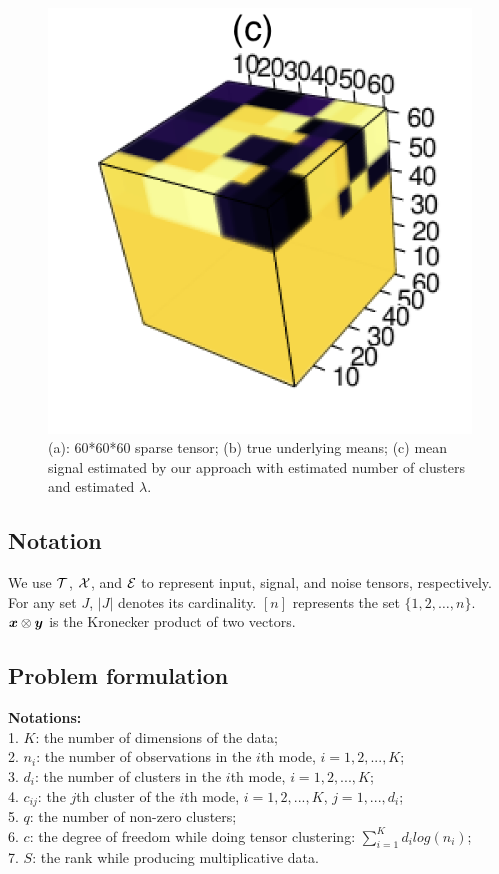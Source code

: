 \documentclass{article}
\begin{document}
\begin{figure}
	\includegraphics[scale=0.5]{figures/figure2/output.png}
	\caption{(a): 60*60*60 sparse tensor; (b) true underlying means; (c) mean signal estimated by our approach with estimated number of clusters and estimated $\lambda$.}
	\label{fig2}
\end{figure}
\subsection{Notation}
We use $\mathcal{T}$, $\mathcal{X}$, and $\mathcal{E}$ to represent input, signal, and noise tensors, respectively. For any set $J$, $|J|$ denotes its cardinality. $[n]$ represents the set $\{1,2,\ldots,n\}$. $\bm x\otimes \bm{y}$ is the Kronecker product of two vectors. 


\subsection{Problem formulation}
\textbf{Notations:}\\
1. $K$: the number of dimensions of the data;\\
2. $n_i$: the number of observations in the $i$th mode, $i=1,2,...,K$;\\
3. $d_i$: the number of clusters in the $i$th mode, $i=1,2,...,K$;\\
4. $c_{ij}$: the $j$th cluster of the $i$th mode, $i=1,2,...,K$, $j=1,...,d_i$;\\
5. $q$: the number of non-zero clusters;\\
6. $c$: the degree of freedom while doing tensor clustering: $\sum_{i=1}^Kd_ilog(n_i)$;\\
7. $S$: the rank while producing multiplicative data.
\end{document}
